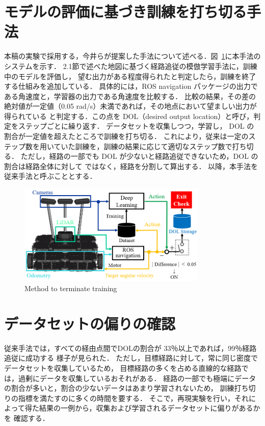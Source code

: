 \documentclass{jarticle}
\renewcommand{\figurename}{図~}
\newcommand{\figref}[1]{\figurename\ref{#1}}
\begin{document}
\section{モデルの評価に基づき訓練を打ち切る手法}
本稿の実験で採用する，今井らが提案した手法について述べる．\figref{fig:5}に本手法のシステムを示す．
2.1節で述べた地図に基づく経路追従の模倣学習手法に，訓練中のモデルを評価し，
望む出力がある程度得られたと判定したら，訓練を終了する仕組みを追加している．
具体的には，ROS navigation パッケージの出力である角速度と，学習器の出力である角速度を比較する．
比較の結果，その差の絶対値が一定値（0.05 rad/s）未満であれば，その地点において望ましい出力が得られている
と判定する．この点を DOL（desired output location）と呼び，判定をステップごとに繰り返す．
データセットを収集しつつ，学習し， DOL の割合が一定値を超えたところで訓練を打ち切る．
これにより，従来は一定のステップ数を用いていた訓練を，訓練の結果に応じて適切なステップ数で打ち切る．
ただし，経路の一部でも DOL が少ないと経路追従できないため，DOL の割合は経路全体に対して
ではなく，経路を分割して算出する．
以降，本手法を従来手法と呼ぶこととする．

\begin{figure}[h!]
  \centering
   \includegraphics[height=48mm]{./png/moderu.png}
   \caption{Method to terminate training}
   \label{fig:5}
\end{figure}



\section{データセットの偏りの確認}
従来手法では，すべての経由点間でDOLの割合が 33％以上であれば，99％経路追従に成功する
様子が見られた\cite{imai2}．
ただし，目標経路に対して，常に同じ密度でデータセットを収集しているため，
目標経路の多くを占める直線的な経路では，過剰にデータを収集しているおそれがある．
経路の一部でも極端にデータの割合が多いと，割合の少ないデータはあまり学習されないため，
訓練打ち切りの指標を満たすのに多くの時間を要する．
そこで，再現実験を行い，それによって得た結果の一例から，収集および学習されるデータセットに偏りがあるかを
確認する．
\end{document}

